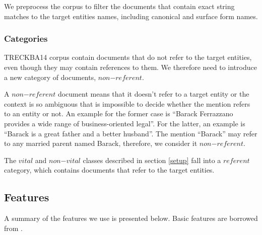 \documentclass{article}
\begin{document}
We preprocess the corpus to filter the documents that contain exact string matches to the target entities names, including canonical and surface form names.

\subsubsection{Categories}
\label{subcat}

TRECKBA14 corpus contain documents that do not refer to the target entities, even though they may contain references to them. We therefore need to introduce a new category of documents, $non\mathord{-}referent$. 

A $non\mathord{-}referent$ document means that it doesn't refer to a target entity or the context is so ambiguous that is impossible to decide whether the mention refers to an entity or not. An example for the former case is ``Barack Ferrazzano provides a wide range of business-oriented legal''. For the latter, an example is ``Barack is a great father and a better husband''. The mention ``Barack'' may refer to any married parent named Barack, therefore, we consider it $non\mathord{-}referent$.

The $vital$ and $non\mathord{-}vital$ classes described in section \ref{setup} fall into a $referent$ category, which contains documents that refer to the target entities.

\subsection{Features}
\label{feat}

A summary of the features we use is presented below. Basic features are borrowed from \cite{jingang13}.
\end{document}
